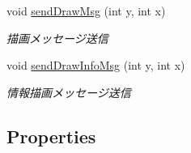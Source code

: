 \begin{DoxyCompactItemize}
void \hyperlink{class_reversi_wpf_1_1_reversi_play_acf2427a8a68d437b792975866fbf754d}{send\+Draw\+Msg} (int y, int x)
\begin{DoxyCompactList}\small\item\em 描画メッセージ送信 \end{DoxyCompactList}\item 
void \hyperlink{class_reversi_wpf_1_1_reversi_play_ad05442c4f60d564ea30e57e782efe985}{send\+Draw\+Info\+Msg} (int y, int x)
\begin{DoxyCompactList}\small\item\em 情報描画メッセージ送信 \end{DoxyCompactList}\end{DoxyCompactItemize}
\subsection*{Properties}

